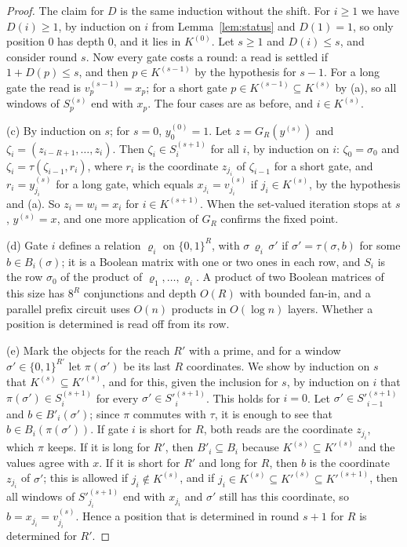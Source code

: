 \documentclass[11pt]{amsart}
\theoremstyle{definition}
\theoremstyle{remark}
\begin{document}
\begin{proof}
The claim for $D$ is the same induction without the shift. For $i\ge1$ we have $D(i)\ge1$, by
induction on $i$ from Lemma~\ref{lem:status} and $D(1)=1$, so only position $0$ has depth $0$,
and it lies in $K^{(0)}$. Let $s\ge1$ and $D(i)\le s$, and consider round $s$. Now every gate
costs a round: a read is settled if $1+D(p)\le s$, and then $p\in K^{(s-1)}$ by the hypothesis
for $s-1$. For a long gate the read is $v^{(s-1)}_p=x_p$; for a short gate
$p\in K^{(s-1)}\subseteq K^{(s)}$ by (a), so all windows of $S^{(s)}_p$ end with $x_p$. The four
cases are as before, and $i\in K^{(s)}$.

(c) By induction on $s$; for $s=0$, $y^{(0)}_0=1$. Let $z=G_R(y^{(s)})$ and
$\zeta_i=(z_{i-R+1},\dots,z_i)$. Then $\zeta_i\in S^{(s+1)}_i$ for all $i$, by induction on $i$:
$\zeta_0=\sigma_0$ and $\zeta_i=\tau(\zeta_{i-1},r_i)$, where $r_i$ is the coordinate $z_{j_i}$ of
$\zeta_{i-1}$ for a short gate, and $r_i=y^{(s)}_{j_i}$ for a long gate, which equals
$x_{j_i}=v^{(s)}_{j_i}$ if $j_i\in K^{(s)}$, by the hypothesis and (a). So $z_i=w_i=x_i$ for
$i\in K^{(s+1)}$. When the set-valued iteration stops at $s$, $y^{(s)}=x$, and one more
application of $G_R$ confirms the fixed point.

(d) Gate $i$ defines a relation $\varrho_i$ on $\{0,1\}^R$, with $\sigma\,\varrho_i\,\sigma'$ if
$\sigma'=\tau(\sigma,b)$ for some $b\in B_i(\sigma)$; it is a Boolean matrix with one or two
ones in each row, and $S_i$ is the row $\sigma_0$ of the product of $\varrho_1,\dots,\varrho_i$.
A product of two Boolean matrices of this size has $8^R$ conjunctions and depth $O(R)$ with
bounded fan-in, and
a parallel prefix circuit uses $O(n)$ products in $O(\log n)$ layers. Whether a position is
determined is read off from its row.

(e) Mark the objects for the reach $R'$ with a prime, and for a window $\sigma'\in\{0,1\}^{R'}$
let $\pi(\sigma')$ be its last $R$ coordinates. We show by induction on $s$ that
$K^{(s)}\subseteq K'^{(s)}$, and for this, given the inclusion for $s$, by induction on $i$ that
$\pi(\sigma')\in S^{(s+1)}_i$ for every $\sigma'\in S'^{(s+1)}_i$. This holds for $i=0$. Let
$\sigma'\in S'^{(s+1)}_{i-1}$ and $b\in B'_i(\sigma')$; since $\pi$ commutes with $\tau$, it is
enough to see that $b\in B_i(\pi(\sigma'))$. If gate $i$ is short for $R$, both reads are the
coordinate $z_{j_i}$, which $\pi$ keeps. If it is long for $R'$, then $B'_i\subseteq B_i$ because
$K^{(s)}\subseteq K'^{(s)}$ and the values agree with $x$. If it is short for $R'$ and long for
$R$, then $b$ is the coordinate $z_{j_i}$ of $\sigma'$; this is allowed if $j_i\notin K^{(s)}$,
and if $j_i\in K^{(s)}\subseteq K'^{(s)}\subseteq K'^{(s+1)}$, then all windows of
$S'^{(s+1)}_{j_i}$ end with $x_{j_i}$ and $\sigma'$ still has this coordinate, so
$b=x_{j_i}=v^{(s)}_{j_i}$. Hence a position that is determined in round $s+1$ for $R$ is
determined for $R'$.


\end{proof}
\end{document}
